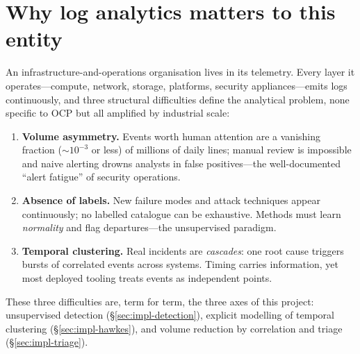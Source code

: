\documentclass[11pt,a4paper]{report}
\begin{document}
\section{Why log analytics matters to this entity}
An infrastructure-and-operations organisation lives in its telemetry.
Every layer it operates---compute, network, storage, platforms, security
appliances---emits logs continuously, and three structural difficulties
define the analytical problem, none specific to OCP but all amplified by
industrial scale:
\begin{enumerate}[nosep,leftmargin=1.6em]
  \item \textbf{Volume asymmetry.} Events worth human attention are a
  vanishing fraction ($\sim10^{-3}$ or less) of millions of daily lines;
  manual review is impossible and naive alerting drowns analysts in false
  positives---the well-documented ``alert fatigue'' of security operations.
  \item \textbf{Absence of labels.} New failure modes and attack techniques
  appear continuously; no labelled catalogue can be exhaustive. Methods must
  learn \emph{normality} and flag departures---the unsupervised paradigm.
  \item \textbf{Temporal clustering.} Real incidents are \emph{cascades}: one
  root cause triggers bursts of correlated events across systems. Timing
  carries information, yet most deployed tooling treats events as
  independent points.
\end{enumerate}
These three difficulties are, term for term, the three axes of this project:
unsupervised detection (\S\ref{sec:impl-detection}), explicit modelling of
temporal clustering (\S\ref{sec:impl-hawkes}), and volume reduction by
correlation and triage (\S\ref{sec:impl-triage}).
\end{document}
